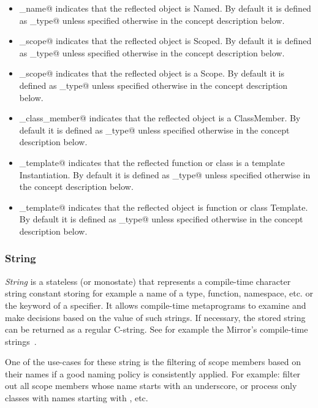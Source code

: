 \begin{itemize}
\item{\verb@has_name@} indicates that the reflected object is {\metaobject Named}.
By default it is defined as \verb@false_type@ unless specified otherwise in the
concept description below.

\item{\verb@has_scope@} indicates that the reflected object is {\metaobject Scoped}.
By default it is defined as \verb@false_type@ unless specified otherwise in the
concept description below.

\item{\verb@is_scope@} indicates that the reflected object is a {\metaobject Scope}.
By default it is defined as \verb@false_type@ unless specified otherwise in the
concept description below.

\item{\verb@is_class_member@} indicates that the reflected object is a {\metaobject ClassMember}.
By default it is defined as \verb@false_type@ unless specified otherwise in the
concept description below.

\item{\verb@has_template@} indicates that the reflected function or class is
a template {\metaobject Instantiation}.
By default it is defined as \verb@false_type@ unless specified otherwise in the
concept description below.

\item{\verb@is_template@} indicates that the reflected object is function or class {\metaobject Template}.
By default it is defined as \verb@false_type@ unless specified otherwise in the
concept description below.
\end{itemize}

\subsubsection{String}

{\em String} is a stateless (or monostate) \verb@class@ that represents a compile-time
character string constant storing for example a name of a type, function, namespace, etc. or the keyword
of a specifier. It allows compile-time metaprograms to examine and make decisions based
on the value of such strings. If necessary, the stored string can be returned
as a regular C-string.
See for example the Mirror's compile-time strings~\cite{mirror-ct-strings}.

One of the use-cases for these string is the filtering of scope members based on their names
if a good naming policy is consistently applied. For example: filter out all scope
members whose name starts with an underscore, or process only classes with names
starting with \verb@DB@, etc.

